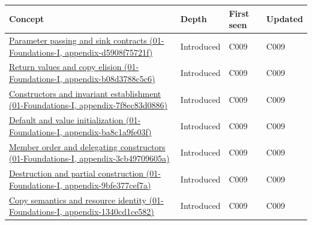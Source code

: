{\def\LTcaptype{none} %
\begin{longtable}[]{@{}
  >{\raggedright\arraybackslash}p{}
  >{\raggedright\arraybackslash}p{}
  >{\raggedright\arraybackslash}p{}
  >{\raggedright\arraybackslash}p{}@{}}
\toprule\noalign{}
\begin{minipage}[b]{\linewidth}\raggedright
Concept
\end{minipage} & \begin{minipage}[b]{\linewidth}\raggedright
Depth
\end{minipage} & \begin{minipage}[b]{\linewidth}\raggedright
First seen
\end{minipage} & \begin{minipage}[b]{\linewidth}\raggedright
Updated
\end{minipage} \\
\midrule\noalign{}
\endhead
\bottomrule\noalign{}
\endlastfoot
\href{../01-Foundations-I/main.pdf\#nameddest=appendix-d5908f75721f}{Parameter passing and sink contracts (01-Foundations-I, appendix-d5908f75721f)} & Introduced & C009 & C009 \\
\href{../01-Foundations-I/main.pdf\#nameddest=appendix-b08d3788c5c6}{Return values and copy elision (01-Foundations-I, appendix-b08d3788c5c6)} & Introduced & C009 & C009 \\
\href{../01-Foundations-I/main.pdf\#nameddest=appendix-7f8ec83d0886}{Constructors and invariant establishment (01-Foundations-I, appendix-7f8ec83d0886)} & Introduced & C009 & C009 \\
\href{../01-Foundations-I/main.pdf\#nameddest=appendix-ba8c1a9fe03f}{Default and value initialization (01-Foundations-I, appendix-ba8c1a9fe03f)} & Introduced & C009 & C009 \\
\href{../01-Foundations-I/main.pdf\#nameddest=appendix-3cb49709605a}{Member order and delegating constructors (01-Foundations-I, appendix-3cb49709605a)} & Introduced & C009 & C009 \\
\href{../01-Foundations-I/main.pdf\#nameddest=appendix-9bfe377cef7a}{Destruction and partial construction (01-Foundations-I, appendix-9bfe377cef7a)} & Introduced & C009 & C009 \\
\href{../01-Foundations-I/main.pdf\#nameddest=appendix-1340cd1ce582}{Copy semantics and resource identity (01-Foundations-I, appendix-1340cd1ce582)} & Introduced & C009 & C009 \\

\end{longtable}}
